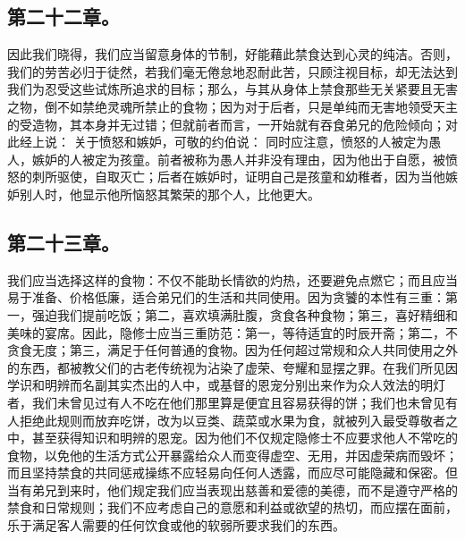 
\subsection{第二十二章。}

\par

因此我们晓得，我们应当留意身体的节制，好能藉此禁食达到心灵的纯洁。否则，我们的劳苦必归于徒然，若我们毫无倦怠地忍耐此苦，只顾注视目标，却无法达到我们为忍受这些试炼所追求的目标；那么，与其从身体上禁食那些无关紧要且无害之物，倒不如禁绝灵魂所禁止的食物；因为对于后者，只是单纯而无害地领受天主的受造物，其本身并无过错；但就前者而言，一开始就有吞食弟兄的危险倾向；对此经上说： 关于愤怒和嫉妒，可敬的约伯说： 同时应注意，愤怒的人被定为愚人，嫉妒的人被定为孩童。前者被称为愚人并非没有理由，因为他出于自愿，被愤怒的刺所驱使，自取灭亡；后者在嫉妒时，证明自己是孩童和幼稚者，因为当他嫉妒别人时，他显示他所恼怒其繁荣的那个人，比他更大。\par


\subsection{第二十三章。}

\par

我们应当选择这样的食物：不仅不能助长情欲的灼热，还要避免点燃它；而且应当易于准备、价格低廉，适合弟兄们的生活和共同使用。因为贪饕的本性有三重：第一，强迫我们提前吃饭；第二，喜欢填满肚腹，贪食各种食物；第三，喜好精细和美味的宴席。因此，隐修士应当三重防范：第一，等待适宜的时辰开斋；第二，不贪食无度；第三，满足于任何普通的食物。因为任何超过常规和众人共同使用之外的东西，都被教父们的古老传统视为沾染了虚荣、夸耀和显摆之罪。在我们所见因学识和明辨而名副其实杰出的人中，或基督的恩宠分别出来作为众人效法的明灯者，我们未曾见过有人不吃在他们那里算是便宜且容易获得的饼；我们也未曾见有人拒绝此规则而放弃吃饼，改为以豆类、蔬菜或水果为食，就被列入最受尊敬者之中，甚至获得知识和明辨的恩宠。因为他们不仅规定隐修士不应要求他人不常吃的食物，以免他的生活方式公开暴露给众人而变得虚空、无用，并因虚荣病而毁坏；而且坚持禁食的共同惩戒操练不应轻易向任何人透露，而应尽可能隐藏和保密。但当有弟兄到来时，他们规定我们应当表现出慈善和爱德的美德，而不是遵守严格的禁食和日常规则；我们不应考虑自己的意愿和利益或欲望的热切，而应摆在面前，乐于满足客人需要的任何饮食或他的软弱所要求我们的东西。\par

